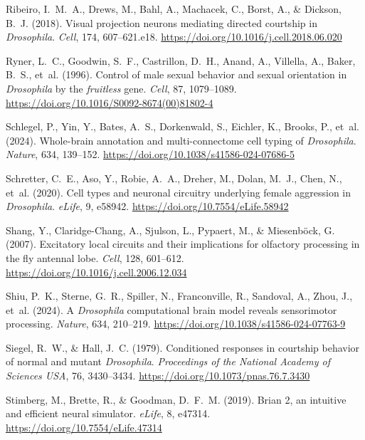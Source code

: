 Ribeiro, I.~M.~A., Drews, M., Bahl, A., Machacek, C., Borst, A., \& Dickson, B.~J. (2018). Visual projection neurons mediating directed courtship in \emph{Drosophila}. \emph{Cell}, 174, 607--621.e18. \url{https://doi.org/10.1016/j.cell.2018.06.020}

Ryner, L.~C., Goodwin, S.~F., Castrillon, D.~H., Anand, A., Villella, A., Baker, B.~S., et~al. (1996). Control of male sexual behavior and sexual orientation in \emph{Drosophila} by the \emph{fruitless} gene. \emph{Cell}, 87, 1079--1089. \url{https://doi.org/10.1016/S0092-8674(00)81802-4}

Schlegel, P., Yin, Y., Bates, A.~S., Dorkenwald, S., Eichler, K., Brooks, P., et~al. (2024). Whole-brain annotation and multi-connectome cell typing of \emph{Drosophila}. \emph{Nature}, 634, 139--152. \url{https://doi.org/10.1038/s41586-024-07686-5}

Schretter, C.~E., Aso, Y., Robie, A.~A., Dreher, M., Dolan, M.~J., Chen, N., et~al. (2020). Cell types and neuronal circuitry underlying female aggression in \emph{Drosophila}. \emph{eLife}, 9, e58942. \url{https://doi.org/10.7554/eLife.58942}

Shang, Y., Claridge-Chang, A., Sjulson, L., Pypaert, M., \& Miesenb\"{o}ck, G. (2007). Excitatory local circuits and their implications for olfactory processing in the fly antennal lobe. \emph{Cell}, 128, 601--612. \url{https://doi.org/10.1016/j.cell.2006.12.034}

Shiu, P.~K., Sterne, G.~R., Spiller, N., Franconville, R., Sandoval, A., Zhou, J., et~al. (2024). A \emph{Drosophila} computational brain model reveals sensorimotor processing. \emph{Nature}, 634, 210--219. \url{https://doi.org/10.1038/s41586-024-07763-9}

Siegel, R.~W., \& Hall, J.~C. (1979). Conditioned responses in courtship behavior of normal and mutant \emph{Drosophila}. \emph{Proceedings of the National Academy of Sciences USA}, 76, 3430--3434. \url{https://doi.org/10.1073/pnas.76.7.3430}

Stimberg, M., Brette, R., \& Goodman, D.~F.~M. (2019). Brian 2, an intuitive and efficient neural simulator. \emph{eLife}, 8, e47314. \url{https://doi.org/10.7554/eLife.47314}


